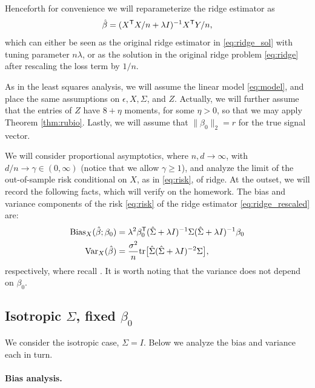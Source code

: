 \documentclass{article}
\begin{document}
Henceforth for convenience we will reparameterize the ridge estimator as 
\begin{equation}
\label{eq:ridge_rescaled}
\hat{\beta} = (X^{\mathsf{T}} X/n + \lambda I)^{-1} X^{\mathsf{T}} Y/n,
\end{equation}
which can either be seen as the original ridge estimator in \eqref{eq:ridge_sol}
with tuning parameter $n\lambda$, or as the solution in the original ridge
problem \eqref{eq:ridge} after rescaling the loss term by $1/n$. 

As in the least squares analysis, we will assume the linear model
\eqref{eq:model}, and place the same assumptions on $\epsilon, X, \Sigma$, and
$Z$. Actually, we will further assume that the entries of $Z$ have $8+\eta$  
moments, for some $\eta>0$, so that we may apply Theorem
\ref{thm:rubio}. Lastly, we will assume that $\|\beta_0\|_2 = r$ for the true
signal vector. 

We will consider proportional asymptotics, where $n,d \to \infty$, with $d/n \to
\gamma \in (0,\infty)$ (notice that we allow $\gamma \geq 1$), and analyze the
limit of the out-of-sample risk conditional on $X$, as in \eqref{eq:risk}, of
ridge. At the outset, we will record the following facts, which will verify on
the homework. The bias and variance components of the risk \eqref{eq:risk} of
the ridge estimator \eqref{eq:ridge_rescaled} are:  
\begin{align}
\label{eq:ridge_bias}
\mathrm{Bias}_X(\hat{\beta}; \beta_0) &= \lambda^2 \beta_0^{\mathsf{T}} (\hat\Sigma + \lambda I)^{-1}
  \Sigma (\hat\Sigma + \lambda I)^{-1} \beta_0 \\ 
\label{eq:ridge_var}
\mathrm{Var}_X(\hat{\beta}) &= \frac{\sigma^2}{n} \mathrm{tr} \big[ \hat\Sigma ( \hat\Sigma + \lambda
  I)^{-2} \Sigma \big],
\end{align}
respectively, where recall . It is worth noting that
the variance does not depend on $\beta_0$. 

\subsection{Isotropic $\Sigma$, fixed $\beta_0$}

\def\SNR{\mathrm{SNR}}

We consider the isotropic case, $\Sigma = I$. Below we analyze the bias and 
variance each in turn.    

\paragraph{Bias analysis.}
\end{document}
